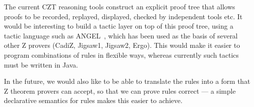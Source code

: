 \documentclass{entcs}
\begin{document}
The current CZT reasoning tools construct an explicit proof tree that
allows proofs to be recorded, replayed, displayed, checked by independent
tools etc.
It would be interesting to build a tactic layer on top of this proof
tree, using a tactic language such as ANGEL~\cite{martin:tactics}, which
has been used as the basis of several other Z provers (CadiZ, Jigsaw1,
Jigsaw2, Ergo).  This would make it easier to program combinations of rules
in flexible ways, whereas currently such tactics must be written in Java.

In the future, we would also like to be able to translate the rules
into a form that Z theorem provers can accept, so that we can prove
rules correct --- a simple declarative semantics for rules makes this
easier to achieve.
\end{document}
